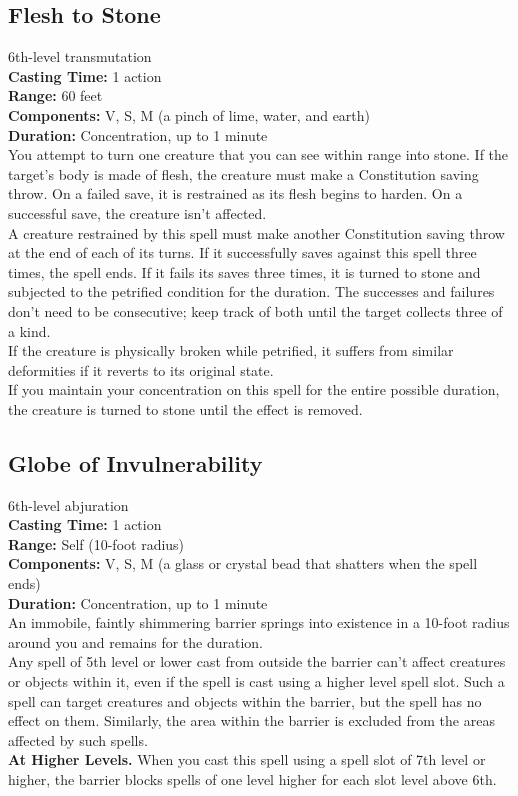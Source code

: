 \documentclass[11pt, A4paper, english]{article}
\begin{document}
		\subsection{Flesh to Stone}
6th-level transmutation \\
\textbf{Casting Time:} 1 action \\
\textbf{Range:} 60 feet \\
\textbf{Components:} V, S, M (a pinch of lime, water, and earth) \\
\textbf{Duration:} Concentration, up to 1 minute \\
You attempt to turn one creature that you can see within range into stone. If the target’s body is made of flesh, the creature must make a Constitution saving throw. On a failed save, it is restrained as its flesh begins to harden. On a successful save, the creature isn’t affected. \\
A creature restrained by this spell must make another Constitution saving throw at the end of each of its turns. If it successfully saves against this spell three times, the spell ends. If it fails its saves three times, it is turned to stone and subjected to the petrified condition for the duration. The successes and failures don’t need to be consecutive; keep track of both until the target collects three of a kind. \\
If the creature is physically broken while petrified, it suffers from similar deformities if it reverts to its original state. \\
If you maintain your concentration on this spell for the entire possible duration, the creature is turned to stone until the effect is removed.

		\subsection{Globe of Invulnerability}
6th-level abjuration \\
\textbf{Casting Time:} 1 action \\
\textbf{Range:} Self (10-foot radius) \\
\textbf{Components:} V, S, M (a glass or crystal bead that shatters when the spell ends) \\
\textbf{Duration:} Concentration, up to 1 minute \\
An immobile, faintly shimmering barrier springs into existence in a 10-foot radius around you and remains for the duration. \\
Any spell of 5th level or lower cast from outside the barrier can't affect creatures or objects within it, even if the spell is cast using a higher level spell slot. Such a spell can target creatures and objects within the barrier, but the spell has no effect on them. Similarly, the area within the barrier is excluded from the areas affected by such spells. \\
\textbf{At Higher Levels.} When you cast this spell using a spell slot of 7th level or higher, the barrier blocks spells of one level higher for each slot level above 6th.
\end{document}
